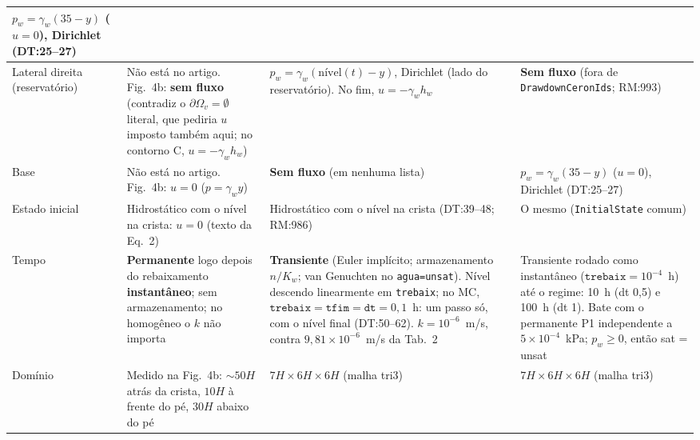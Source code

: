 \documentclass[11pt,a4paper]{article}
\newcommand{\gw}{\gamma_w}
\begin{document}
\begin{landscape}
\begin{longtable}{>{\raggedright}p{2.6cm}>{\raggedright}p{6.6cm}>{\raggedright}p{7.0cm}>{\raggedright\arraybackslash}p{6.4cm}}
  $p_w = \gw(35 - y)$ ($u = 0$), Dirichlet (DT:25--27) \\ \midrule
Lateral direita (reservatório) & Não está no artigo. Fig.~4b: \textbf{sem fluxo} (contradiz o
  $\partial\Omega_v = \emptyset$ literal, que pediria $u$ imposto também aqui; no contorno C, $u = -\gw h_w$) &
  $p_w = \gw(\text{nível}(t) - y)$, Dirichlet (lado do reservatório). No fim, $u = -\gw h_w$ &
  \textbf{Sem fluxo} (fora de \texttt{DrawdownCeronIds}; RM:993) \\ \midrule
Base & Não está no artigo. Fig.~4b: $u = 0$ ($p = \gw y$) & \textbf{Sem fluxo} (em nenhuma lista) &
  $p_w = \gw(35 - y)$ ($u = 0$), Dirichlet (DT:25--27) \\ \midrule
Estado inicial & Hidrostático com o nível na crista: $u = 0$ (texto da Eq.~2) &
  Hidrostático com o nível na crista (DT:39--48; RM:986) & O mesmo (\texttt{InitialState} comum) \\ \midrule
Tempo & \textbf{Permanente} logo depois do rebaixamento \textbf{instantâneo}; sem armazenamento; no homogêneo o $k$
  não importa &
  \textbf{Transiente} (Euler implícito; armazenamento $n/K_w$; van Genuchten no \texttt{agua=unsat}). Nível descendo
  linearmente em \texttt{trebaix}; no MC, $\texttt{trebaix} = \texttt{tfim} = \texttt{dt} = 0{,}1$~h: um passo só,
  com o nível final (DT:50--62). $k = 10^{-6}$~m/s, contra $9{,}81\times10^{-6}$~m/s da Tab.~2 &
  Transiente rodado como instantâneo ($\texttt{trebaix} = 10^{-4}$~h) até o regime: 10~h (dt 0,5) e 100~h (dt 1).
  Bate com o permanente P1 independente a $5\times10^{-4}$~kPa; $p_w \ge 0$, então sat = unsat \\ \midrule
Domínio & Medido na Fig.~4b: $\sim 50H$ atrás da crista, $10H$ à frente do pé, $30H$ abaixo do pé &
  $7H \times 6H \times 6H$ (malha tri3) & $7H \times 6H \times 6H$ (malha tri3) \\
\end{longtable}
\end{landscape}
\end{document}
